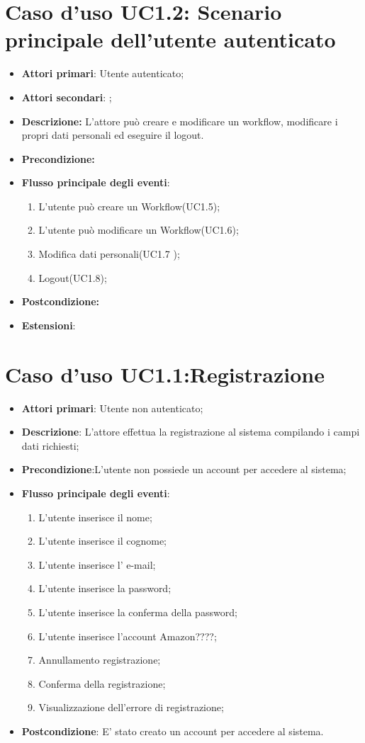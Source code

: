 \section{Caso d'uso UC1.2: Scenario principale dell'utente autenticato}
\begin{itemize}
	\item \textbf{Attori primari}: Utente autenticato;
	\item \textbf{Attori secondari}: ;
	\item \textbf{Descrizione:} L'attore può creare e modificare un workflow, modificare i propri dati personali ed eseguire il logout.
	\item \textbf{Precondizione:}
	\item \textbf{Flusso principale degli eventi}:
	\begin{enumerate}
		\item L'utente può creare un Workflow(UC1.5);
		\item L'utente può modificare un Workflow(UC1.6);
		\item Modifica dati personali(UC1.7 );
		\item Logout(UC1.8);
	\end{enumerate}
	\item \textbf{Postcondizione:} 
	\item \textbf{Estensioni}:

\end{itemize}

\section{Caso d'uso UC1.1:Registrazione}
\begin{itemize}
	\item \textbf{Attori primari}: Utente non autenticato;
	\item \textbf{Descrizione}: L'attore effettua la registrazione al sistema compilando i campi dati richiesti;
	\item \textbf{Precondizione}:L'utente non possiede un account per accedere al sistema;
	\item \textbf{Flusso principale degli eventi}:
		\begin{enumerate}
			\item L'utente inserisce il nome;
			\item L'utente inserisce il cognome; 
			\item L'utente inserisce l' e-mail;
			\item L'utente inserisce la password;
			\item L'utente inserisce la conferma della password;
			\item L'utente inserisce l'account Amazon????;
			\item Annullamento registrazione;
			\item Conferma della registrazione;
			\item Visualizzazione dell'errore di registrazione;
	\end{enumerate}
	\item \textbf{Postcondizione}: E' stato creato un account per accedere al sistema.
\end{itemize}

